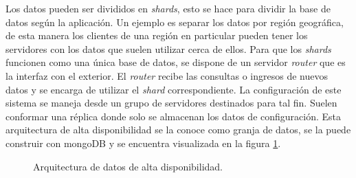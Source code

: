 Los datos pueden ser divididos en \emph{shards}, esto se hace para dividir la base de datos según la aplicación.
Un ejemplo es separar los datos por región geográfica, de esta manera los clientes de una región en particular pueden tener los servidores con los datos que suelen utilizar cerca de ellos.
Para que los \emph{shards} funcionen como una única base de datos, se dispone de un servidor \emph{router} que es la interfaz con el exterior.
El \emph{router} recibe las consultas o ingresos de nuevos datos y se encarga de utilizar el \emph{shard} correspondiente.
La configuración de este sistema se maneja desde un grupo de servidores destinados para tal fin.
Suelen conformar una réplica donde solo se almacenan los datos de configuración.
Esta arquitectura de alta disponibilidad se la conoce como granja de datos, se la puede construir con mongoDB \citep{WEBSITE:mongodbSharding} y se encuentra visualizada en la figura \ref{fig:ch1DatosAltaDisponibilidad}.

\begin{figure}[h]
	\centering
	\caption{Arquitectura de datos de alta disponibilidad.}
	\label{fig:ch1DatosAltaDisponibilidad}
\end{figure}

